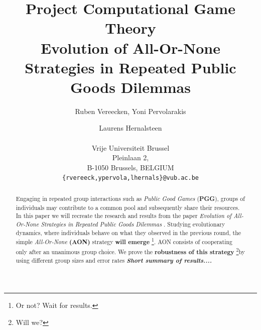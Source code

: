 \documentclass[letterpaper]{article}
\title{Project Computational Game Theory\\Evolution of All-Or-None Strategies in Repeated Public Goods Dilemmas}
\author{Ruben Vereecken, Yoni Pervolarakis \and Laurens Hernalsteen \\
\mbox{}\\Vrije Universiteit Brussel \\Pleinlaan 2, \\B-1050 Brussels, BELGIUM\\
{\texttt{\{rvereeck,ypervola,lhernals\}@vub.ac.be}}}
\begin{document}
\maketitle

\begin{abstract}
Engaging in repeated group interactions such as \textit{Public Good Games}  (\textbf{PGG}), groups of individuals may contribute to a common pool and subsequently share their resources. In this paper we will recreate the research and results from the paper  \textit{Evolution of All-Or-None Strategies in Repeated Public Goods Dilemmas}  \citep{project}. Studying evolutionary dynamics, where individuals behave on what they observed in the previous round, the simple \textit{All-Or-None} \textbf{(AON)} strategy  \textbf{will emerge} \footnote{Or not? Wait for results.}. AON consists of cooperating only after an unanimous group choice. We prove the \textbf{robustness of this strategy} \footnote{Will we?}by using different group sizes and error rates
\textit{\textbf{Short summary of results....}}


\end{abstract}
\end{document}
